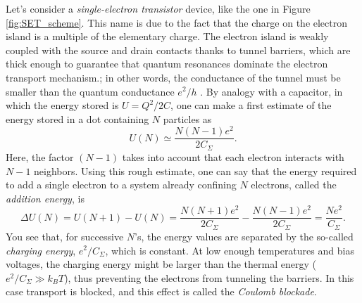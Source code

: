 Let's consider a \emph{single-electron transistor} device, like the one in Figure \ref{fig:SET_scheme}. This name is due to the fact that the charge on the electron island is a multiple of the elementary charge. The electron island is weakly coupled with the source and drain contacts thanks to tunnel barriers, which are thick enough to guarantee that quantum resonances dominate the electron transport mechanism.; in other words, the conductance of the tunnel must be smaller than the quantum conductance $e^2/h$ \citep[see][]{Reimann2002}. By analogy with a capacitor, in which the energy stored is $U=Q^2/2C$, one can make a first estimate of the energy stored in a dot containing $N$ particles as
\begin{equation}
	U(N) \simeq \frac{N(N-1)e^2}{2C_{\Sigma}}.
\end{equation}
Here, the factor $(N-1)$ takes into account that each electron interacts with $N-1$ neighbors. Using this rough estimate, one can say that the energy required to add a single electron to a system already confining $N$ electrons, called the \emph{addition energy}, is
\begin{equation}
	\Delta U (N) = U(N+1)-U(N) = \frac{N(N+1)e^2}{2C_{\Sigma}} - \frac{N(N-1)e^2}{2C_{\Sigma}} = \frac{Ne^2}{C_{\Sigma}}.
\end{equation}
You see that, for successive $N$'s, the energy values are separated by the so-called \emph{charging energy}, $e^2/C_{\Sigma}$, which is constant. At low enough temperatures and bias voltages, the charging energy might be larger than the thermal energy ($e^2/C_{\Sigma} \gg k_BT$), thus preventing the electrons from tunneling the barriers. In this case transport is blocked, and this effect is called the \emph{Coulomb blockade}.

